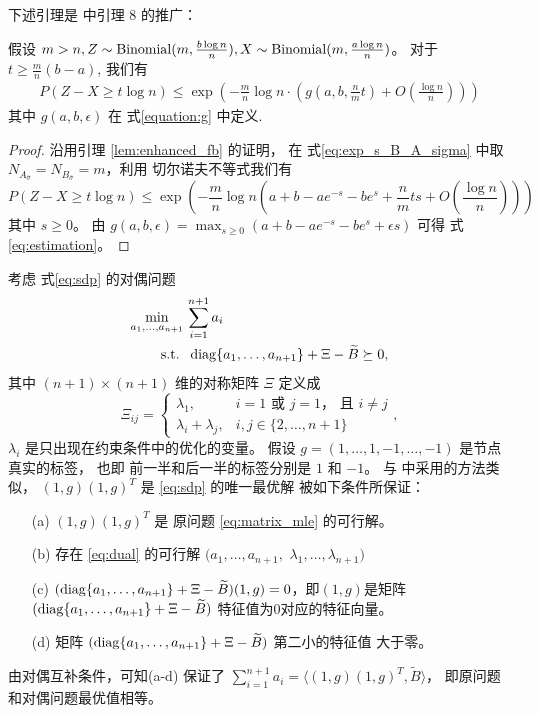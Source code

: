 下述引理是
\citet{abbe2015exact}
中引理 8 的推广：
\begin{lemma}\label{lem:zxt}
    假设 $m > n, Z \sim \operatorname{Binomial}(m, \frac{b\log n}{n}), X\sim \operatorname{Binomial}(m, \frac{a\log n}{n})$。
    对于 $ t \geq \frac{m}{n}(b - a)$, 我们有
    \begin{align}\label{eq:estimation}
        P(Z - X \geq t \log n) \leq \exp(-\frac{m}{n}\log n \cdot ( g(a, b, \frac{n}{m}t) + O(\frac{\log n}{n})))
    \end{align}
    其中 $g(a,b,\epsilon)$ 在 式\eqref{equation:g} 中定义.
\end{lemma}
\begin{proof}
    沿用引理 \ref{lem:enhanced_fb} 的证明，
在 式\eqref{eq:exp_s_B_A_sigma}
中取  $N_{A_{\bar{\sigma}}}
=N_{B_{\bar{\sigma}}}=m$，利用
切尔诺夫不等式我们有
\begin{equation*}
    P(Z - X \geq t \log n) \leq \exp(-\frac{m}{n}\log n (a+b-ae^{-s}-be^s+\frac{n}{m}ts + O(\frac{\log n}{n})))
\end{equation*}
其中 $s \geq 0$。
由 $g(a,b,\epsilon) = 
\max_{s \geq 0} (a+b-a e^{-s} - b e^s + \epsilon s)$
可得 式 \eqref{eq:estimation}。
\end{proof}
考虑 式\eqref{eq:sdp} 的对偶问题
\begin{align}
    \min_{a_1, \dots, a_{n+1}}\, &\sum_{i=1}^{n+1} a_i \nonumber\\
    \label{eq:dual}
    \textrm{s.t. } &\, \operatorname{diag}\{a_1, \dots, a_{n+1}\} + \Xi - \widetilde{B} \succeq 0, 
\end{align}
其中 $(n+1)\times (n+1)$ 维的对称矩阵
$\Xi$ 定义成 
\begin{equation}
    \Xi_{ij} = \begin{cases}
        \lambda_1, & i=1\text{ 或 }j=1 \text{， 且 }i\ne j\\
        \lambda_i + \lambda_j, & i, j\in\{2,\ldots,n+1\}
    \end{cases},
\end{equation}
$\lambda_i$ 是只出现在约束条件中的优化的变量。
假设 $g=(1,\ldots,1,-1,\ldots,-1)$ 是节点真实的标签，
也即
前一半和后一半的标签分别是  $1$ 和 $-1$。
与 \citet{abbe2015exact} 中采用的方法类似，
$(1,g)(1,g)^T$ 是 \eqref{eq:sdp} 的唯一最优解
 被如下条件所保证：
\begin{enumerate}
    \item[(a)] $(1,g)(1,g)^T$ 是 原问题 \eqref{eq:matrix_mle} 的可行解。
    \item[(b)] 存在 \eqref{eq:dual} 的可行解 $(a_1,\ldots,a_{n+1},$ $\lambda_1,\ldots,\lambda_{n+1})$ 
    \item[(c)] $(\operatorname{diag}\{a_1, \dots, a_{n+1}\} + \Xi - \widetilde{B})(1,g)=0$，即$(1,g)$是矩阵 $(\operatorname{diag}\{a_1, \dots, a_{n+1}\} + \Xi - \widetilde{B})$ 特征值为0对应的特征向量。
    \item[(d)]  矩阵 $(\operatorname{diag}\{a_1, \dots, a_{n+1}\} + \Xi - \widetilde{B})$ 第二小的特征值 大于零。 
\end{enumerate}
由对偶互补条件，可知(a-d) 保证了 
$\sum_{i=1}^{n+1} a_i=\langle(1,g)(1,g)^T,\widetilde{B} \rangle$，
即原问题和对偶问题最优值相等。


